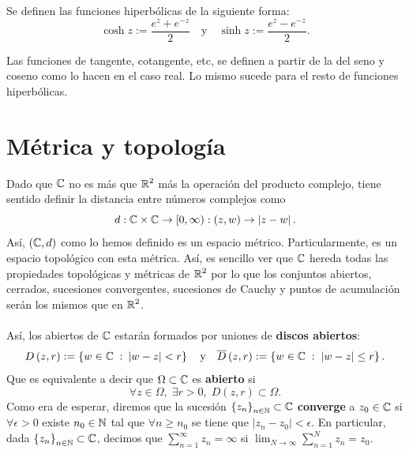 \begin{definition}
Se definen las funciones hiperbólicas de la siguiente forma: 
\[\cosh z := \frac{e^{z}+e^{-z}}{2} \quad \text{y} \quad \sinh z := \frac{e^{z}-e^{-z}}{2} .\]
\end{definition}
\begin{notation}
Las funciones de tangente, cotangente, etc, se definen a partir de la del seno y coseno como lo hacen en el caso real. Lo mismo sucede para el resto de funciones hiperbólicas.
\end{notation}

\section{Métrica y topología}
Dado que $\displaystyle \mathbb{C} $ no es más que $\displaystyle \mathbb{R}^{2} $ más la operación del producto complejo, tiene sentido definir la distancia entre números complejos como 
\[d : \mathbb{C} \times \mathbb{C} \to [0,\infty) : \left(z,w\right) \to \left|z-w\right| .\]
Así, $\displaystyle \left(\mathbb{C}, d\right) $ como lo hemos definido es un espacio métrico. Particularmente, es un espacio topológico con esta métrica. Así, es sencillo ver que $\displaystyle \mathbb{C} $ hereda todas las propiedades topológicas y métricas de $\displaystyle \mathbb{R}^{2} $ por lo que los conjuntos abiertos, cerrados, sucesiones convergentes, sucesiones de Cauchy y puntos de acumulación serán los mismos que en $\displaystyle \mathbb{R}^{2} $. \\
\\
Así, los abiertos de $\displaystyle \mathbb{C} $ estarán formados por uniones de \textbf{discos abiertos}:
\[D\left(z,r\right) : = \left\{ w \in \mathbb{C} \; : \: \left|w-z\right| < r\right\} \quad \text{y} \quad \overline{D}\left(z,r\right):= \left\{ w \in \mathbb{C} \; : \; \left|w-z\right|\leq r\right\}  .\]
Que es equivalente a decir que $\displaystyle \Omega \subset \mathbb{C} $ es \textbf{abierto} si 
\[\forall z \in \Omega, \; \exists r > 0, \; D\left(z, r\right)\subset \Omega  .\]
Como era de esperar, diremos que la sucesión $\displaystyle \left\{ z_{n}\right\} _{n\in\mathbb{N}}\subset \mathbb{C} $ \textbf{converge} a $\displaystyle z_{0} \in \mathbb{C} $ si $\displaystyle \forall \epsilon > 0 $ existe $\displaystyle n_{0} \in \mathbb{N} $ tal que $\displaystyle \forall n \geq n_{0} $ se tiene que $\displaystyle \left|z_{n}-z_{0}\right|<\epsilon  $. 
En particular, dada $\displaystyle \left\{ z_{n}\right\} _{n\in\mathbb{N}}\subset \mathbb{C} $, decimos que $\displaystyle \sum^{\infty}_{n = 1}z_{n}=\infty $ si $\displaystyle \lim_{N \to \infty}\sum^{N}_{n = 1}z_{n} = z_{0} $.\\ \\
